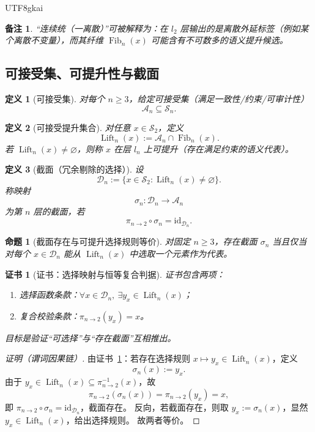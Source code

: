 \documentclass[12pt]{article}
\newtheorem{definition}{定义}[section]
\newtheorem{proposition}{命题}[section]
\newtheorem{remark}{备注}[section]
\newtheorem{Certificate}{证书}[section]
\newcommand{\Lift}{\operatorname{Lift}}
\begin{document}
\begin{CJK*}{UTF8}{gkai}
\begin{remark}
“连续统（一离散）”可被解释为：在 $l_2$ 层输出的是离散外延标签（例如某个离散不变量），而其纤维 $\operatorname{Fib}_n(x)$ 可能含有不可数多的语义提升候选。
\end{remark}

\subsection{可接受集、可提升性与截面}

\begin{definition}[可接受集]\label{def:acceptable}
对每个 $n\ge3$，给定可接受集（满足一致性/约束/可审计性）
\[
\mathcal A_n\subseteq \mathcal S_n.
\]
\end{definition}

\begin{definition}[可接受提升集合]\label{def:lift}
对任意 $x\in\mathcal S_2$，定义
\[
\Lift_n(x):=\mathcal A_n\cap \operatorname{Fib}_n(x).
\]
若 $\Lift_n(x)\neq\varnothing$，则称 $x$ 在层 $l_n$ 上\emph{可提升}（存在满足约束的语义代表）。
\end{definition}

\begin{definition}[截面（冗余剔除的选择）]\label{def:section}
设
\[
\mathcal D_n:=\{x\in\mathcal S_2:\Lift_n(x)\neq\varnothing\}.
\]
称映射
\[
\sigma_n:\mathcal D_n\to \mathcal A_n
\]
为第 $n$ 层的截面，若
\[
\pi_{n\to2}\circ \sigma_n=\mathrm{id}_{\mathcal D_n}.
\]
\end{definition}

\begin{proposition}[截面存在与可提升选择规则等价]\label{prop:section-choice}
对固定 $n\ge 3$，存在截面 $\sigma_n$ 当且仅当对每个 $x\in\mathcal D_n$ 能从 $\Lift_n(x)$ 中选取一个元素作为代表。
\end{proposition}

\begin{Certificate}[证书：选择映射与恒等复合判据]\label{cert:section-choice}
证书包含两项：
\begin{enumerate}
\item 选择函数条款：$\forall x\in\mathcal D_n,\ \exists y_x\in\Lift_n(x)$；
\item 复合校验条款：$\pi_{n\to2}(y_x)=x$。
\end{enumerate}
目标是验证“可选择”与“存在截面”互相推出。
\end{Certificate}

\begin{proof}[证明（谓词因果链）]
由证书~\ref{cert:section-choice}：若存在选择规则 $x\mapsto y_x\in\Lift_n(x)$，定义
\[
\sigma_n(x):=y_x.
\]
由于 $y_x\in\Lift_n(x)\subseteq\pi_{n\to2}^{-1}(x)$，故
\[
\pi_{n\to2}(\sigma_n(x))=\pi_{n\to2}(y_x)=x,
\]
即 $\pi_{n\to2}\circ\sigma_n=\mathrm{id}_{\mathcal D_n}$，截面存在。
反向，若截面存在，则取 $y_x:=\sigma_n(x)$，显然 $y_x\in\Lift_n(x)$，给出选择规则。
故两者等价。
\end{proof}


\end{CJK*}
\end{document}
